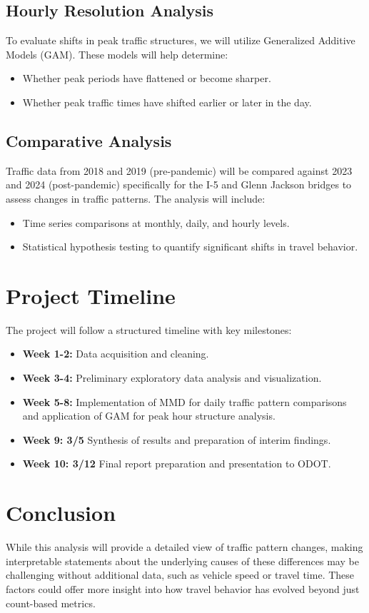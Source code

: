 \documentclass{article}
\begin{document}
\subsection{Hourly Resolution Analysis}
To evaluate shifts in peak traffic structures, we will utilize Generalized Additive Models (GAM). These models will help determine:
\begin{itemize}
    \item Whether peak periods have flattened or become sharper.
    \item Whether peak traffic times have shifted earlier or later in the day.
\end{itemize}

\subsection{Comparative Analysis}
Traffic data from 2018 and 2019 (pre-pandemic) will be compared against 2023 and 2024 (post-pandemic) specifically for the I-5 and Glenn Jackson bridges to assess changes in traffic patterns. The analysis will include:
\begin{itemize}
    \item Time series comparisons at monthly, daily, and hourly levels.
    \item Statistical hypothesis testing to quantify significant shifts in travel behavior.
\end{itemize}

\section{Project Timeline}
The project will follow a structured timeline with key milestones:

\begin{itemize}
    \item \textbf{Week 1-2:} Data acquisition and cleaning.
    \item \textbf{Week 3-4:} Preliminary exploratory data analysis and visualization.
    \item \textbf{Week 5-8:} Implementation of MMD for daily traffic pattern comparisons and application of GAM for peak hour structure analysis.
    \item \textbf{Week 9: 3/5} Synthesis of results and preparation of interim findings.
    \item \textbf{Week 10: 3/12} Final report preparation and presentation to ODOT.
\end{itemize}

\section{Conclusion}
While this analysis will provide a detailed view of traffic pattern changes, making interpretable statements about the underlying causes of these differences may be challenging without additional data, such as vehicle speed or travel time. These factors could offer more insight into how travel behavior has evolved beyond just count-based metrics.
\end{document}
